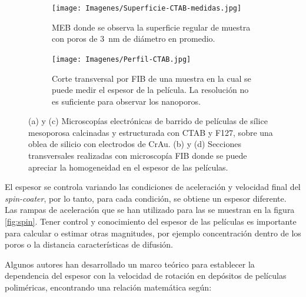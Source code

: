 \begin{figure}[bh!]
\begin{subfigure}[t]{0.495\textwidth}
			       		\label{fig:sem_homogeneidad2}
			       		\end{subfigure}	
			       	\begin{subfigure}[t]{0.495\textwidth}
			        	\texttt{[image: Imagenes/Superficie-CTAB-medidas.jpg]}
			       		\caption{MEB donde se observa la superficie regular de muestra \pdmC\space con poros de \SI{3}{nm} de diámetro en promedio.}
			       		\label{fig:sem_homogeneidad3}
			       		\end{subfigure}
					\begin{subfigure}[t]{0.49\textwidth}
			 	   	    \texttt{[image: Imagenes/Perfil-CTAB.jpg]}
			       		\caption{Corte transversal por FIB de una muestra \pdmC\space en la cual se puede medir el espesor de la película. La resolución no es suficiente para observar los nanoporos.}
			       		\label{fig:sem_homogeneidad4}
			       		\end{subfigure}	
					
					\vspace{-2mm}
					 \caption[MEB \pdmC\space y \pdmF.]{(a) y (c) Microscopías electrónicas de barrido de películas de sílice mesoporosa calcinadas y estructurada con CTAB y F127, sobre una oblea de silicio con electrodos de Cr\textbar Au. (b) y (d) Secciones transversales realizadas con microscopía FIB donde se puede apreciar la homogeneidad en el espesor de las películas.}
					 \label{fig:sem_homogeneidad}	
				     \vspace*{0.2cm}
				     \end{figure}
 	
		 El espesor se controla variando las condiciones de aceleración y velocidad final del \textit{spin-coater}, por lo tanto, para cada condición, se obtiene un espesor diferente. Las rampas de aceleración que se han utilizado para las \pdm\space se muestran en la figura \ref{fig:spin}. Tener control y conocimiento del espesor de las películas es importante para calcular o estimar otras magnitudes, por ejemplo concentración dentro de los poros o la distancia características de difusión. 

		 Algunos autores han desarrollado un marco teórico para establecer la dependencia del espesor con la velocidad de rotación en depósitos de películas poliméricas, encontrando una relación matemática según: \cite{Norrman2005,Meyerhofer1978,Bornside1989,Lora1990}
	
